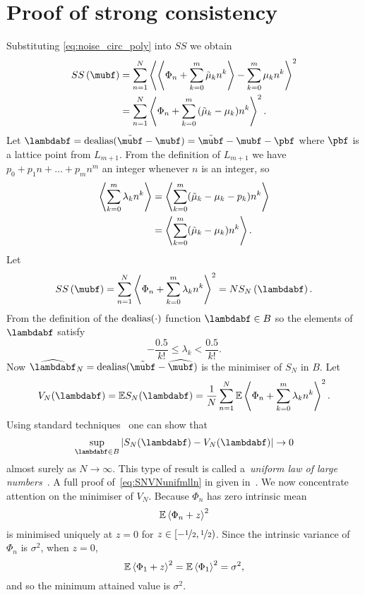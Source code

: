 \documentclass[journal]{IEEEtran}
\begin{document}
\section{Proof of strong consistency}\label{sec:strongconstproof}
 Substituting \eqref{eq:noise_circ_poly} into $SS$ we obtain
 \begin{align*}
SS\left( \mubf \right) &= \sum_{n=1}^{N}\fracpart{ \fracpart{ \Phi_n + \sum_{k = 0}^{m}{\tilde{\mu}_k n^k} } - \sum_{k = 0}^{m}{\mu_k n^k} }^{2} \\
&= \sum_{n=1}^{N}\fracpart{  \Phi_n + \sum_{k = 0}^{m}{(\tilde{\mu}_k - \mu_k) n^k} }^{2}.
\end{align*}
Let $\lambdabf = \dealias(\tilde{\mubf} - \mubf) = \tilde{\mubf} - \mubf - \pbf$ where $\pbf$ is a lattice point from $L_{m+1}$. From the definition of $L_{m+1}$ we have $p_0 + p_1 n + \dots + p_{m} n^m$ an integer whenever $n$ is an integer, so
\begin{align*}
\left\langle \sum_{k=0}^{m}\lambda_k n^k  \right\rangle &= \left\langle \sum_{k=0}^{m}(\tilde{\mu}_k - \mu_k - p_k) n^k  \right\rangle \\
&= \left\langle \sum_{k=0}^{m}(\tilde{\mu}_k - \mu_k) n^k  \right\rangle.
\end{align*}
Let
\[
SS\left( \mubf \right) = \sum_{n=1}^{N}\fracpart{  \Phi_n + \sum_{k = 0}^{m}{\lambda_k n^k} }  ^{2} = N S_{N}\left( \lambdabf \right).
 \]
From the definition of the $\operatorname{dealias}(\cdot)$ function $\lambdabf \in B$ so the elements of $\lambdabf$ satisfy
 \begin{equation} \label{eq:identifiability}
 -\frac{0.5}{k!} \leq \lambda_k < \frac{0.5}{k!}.
 \end{equation} 
Now $\widehat{\lambdabf}_N = \dealias(\tilde{\mubf} - \widehat{\mubf})$ is the minimiser of $S_{N}$ in $B$.  %
Let
\[
V_N(\lambdabf) =  \expect S_N(\lambdabf) = \frac{1}{N}\sum_{n=1}^{N} \expect \fracpart{  \Phi_{n}+\sum_{k = 0}^{m}{\lambda_k n^k}}  ^{2}.
\]
Using standard techniques~\cite{Pollard_conv_stat_proc_1984,van2009empirical} one can show that
 \begin{equation}\label{eq:SNVNunifmlln}
\sup_{\lambdabf \in B}\sabs{S_N(\lambdabf) - V_N(\lambdabf)} \rightarrow 0  
 \end{equation}
almost surely as $N\rightarrow\infty$.  This type of result is called a~\emph{uniform law of large numbers}~\cite{Pollard_conv_stat_proc_1984,van2009empirical}.  A full proof of~\eqref{eq:SNVNunifmlln} in given in~\cite{McKilliam_mean_dir_est_sq_arc_length2010}.  We now concentrate attention on the minimiser of $V_N$. Because $\Phi_n$ has zero intrinsic mean 
\begin{equation}\label{eq:Efracpartmined}
{\mathbb E} \left\langle  \Phi_n + z  \right\rangle^{2}
\end{equation}
is minimised uniquely at $z = 0$ for $z \in [-\nicefrac{1}{2}, \nicefrac{1}{2})$.  Since the intrinsic variance of $\Phi_n$ is $\sigma^2$, when $z = 0$,
\begin{equation}\label{eq:Efracpartphi}
{\mathbb E}\left\langle \Phi_1+z \right\rangle^{2} = {\mathbb E}\left\langle \Phi_1 \right\rangle^{2} = \sigma^2,
\end{equation}
and so the minimum attained value is $\sigma^2$.
\end{document}
